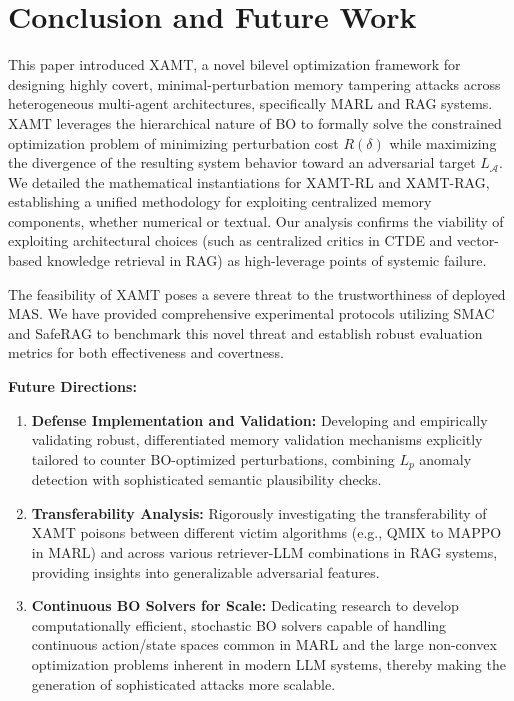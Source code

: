 \documentclass[conference]{IEEEtran}
\begin{document}
\section{Conclusion and Future Work}
This paper introduced XAMT, a novel bilevel optimization framework for designing highly covert, minimal-perturbation memory tampering attacks across heterogeneous multi-agent architectures, specifically MARL and RAG systems. XAMT leverages the hierarchical nature of BO to formally solve the constrained optimization problem of minimizing perturbation cost $R(\delta)$ while maximizing the divergence of the resulting system behavior toward an adversarial target $L_{\mathcal{A}}$. We detailed the mathematical instantiations for XAMT-RL and XAMT-RAG, establishing a unified methodology for exploiting centralized memory components, whether numerical or textual. Our analysis confirms the viability of exploiting architectural choices (such as centralized critics in CTDE and vector-based knowledge retrieval in RAG) as high-leverage points of systemic failure.

The feasibility of XAMT poses a severe threat to the trustworthiness of deployed MAS. We have provided comprehensive experimental protocols utilizing SMAC and SafeRAG to benchmark this novel threat and establish robust evaluation metrics for both effectiveness and covertness.

\textbf{Future Directions:}
\begin{enumerate}
    \item \textbf{Defense Implementation and Validation:} Developing and empirically validating robust, differentiated memory validation mechanisms explicitly tailored to counter BO-optimized perturbations, combining $L_p$ anomaly detection with sophisticated semantic plausibility checks.
    \item \textbf{Transferability Analysis:} Rigorously investigating the transferability of XAMT poisons between different victim algorithms (e.g., QMIX to MAPPO in MARL) and across various retriever-LLM combinations in RAG systems, providing insights into generalizable adversarial features.
    \item \textbf{Continuous BO Solvers for Scale:} Dedicating research to develop computationally efficient, stochastic BO solvers capable of handling continuous action/state spaces common in MARL and the large non-convex optimization problems inherent in modern LLM systems, thereby making the generation of sophisticated attacks more scalable.
\end{enumerate}
\end{document}
